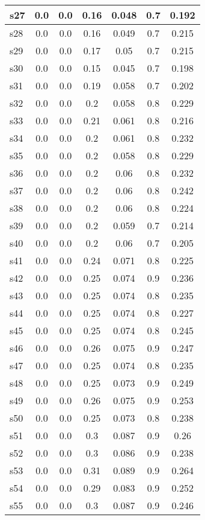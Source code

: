 \documentclass{article}
\begin{document}
\begin{tabular}{|l|c|c|c|c|c|c|}
\hline
s27 &0.0 & 0.0 & 0.16 & 0.048 & 0.7 & 0.192\\
\hline
s28 &0.0 & 0.0 & 0.16 & 0.049 & 0.7 & 0.215\\
\hline
s29 &0.0 & 0.0 & 0.17 & 0.05 & 0.7 & 0.215\\
\hline
s30 &0.0 & 0.0 & 0.15 & 0.045 & 0.7 & 0.198\\
\hline
s31 &0.0 & 0.0 & 0.19 & 0.058 & 0.7 & 0.202\\
\hline
s32 &0.0 & 0.0 & 0.2 & 0.058 & 0.8 & 0.229\\
\hline
s33 &0.0 & 0.0 & 0.21 & 0.061 & 0.8 & 0.216\\
\hline
s34 &0.0 & 0.0 & 0.2 & 0.061 & 0.8 & 0.232\\
\hline
s35 &0.0 & 0.0 & 0.2 & 0.058 & 0.8 & 0.229\\
\hline
s36 &0.0 & 0.0 & 0.2 & 0.06 & 0.8 & 0.232\\
\hline
s37 &0.0 & 0.0 & 0.2 & 0.06 & 0.8 & 0.242\\
\hline
s38 &0.0 & 0.0 & 0.2 & 0.06 & 0.8 & 0.224\\
\hline
s39 &0.0 & 0.0 & 0.2 & 0.059 & 0.7 & 0.214\\
\hline
s40 &0.0 & 0.0 & 0.2 & 0.06 & 0.7 & 0.205\\
\hline
s41 &0.0 & 0.0 & 0.24 & 0.071 & 0.8 & 0.225\\
\hline
s42 &0.0 & 0.0 & 0.25 & 0.074 & 0.9 & 0.236\\
\hline
s43 &0.0 & 0.0 & 0.25 & 0.074 & 0.8 & 0.235\\
\hline
s44 &0.0 & 0.0 & 0.25 & 0.074 & 0.8 & 0.227\\
\hline
s45 &0.0 & 0.0 & 0.25 & 0.074 & 0.8 & 0.245\\
\hline
s46 &0.0 & 0.0 & 0.26 & 0.075 & 0.9 & 0.247\\
\hline
s47 &0.0 & 0.0 & 0.25 & 0.074 & 0.8 & 0.235\\
\hline
s48 &0.0 & 0.0 & 0.25 & 0.073 & 0.9 & 0.249\\
\hline
s49 &0.0 & 0.0 & 0.26 & 0.075 & 0.9 & 0.253\\
\hline
s50 &0.0 & 0.0 & 0.25 & 0.073 & 0.8 & 0.238\\
\hline
s51 &0.0 & 0.0 & 0.3 & 0.087 & 0.9 & 0.26\\
\hline
s52 &0.0 & 0.0 & 0.3 & 0.086 & 0.9 & 0.238\\
\hline
s53 &0.0 & 0.0 & 0.31 & 0.089 & 0.9 & 0.264\\
\hline
s54 &0.0 & 0.0 & 0.29 & 0.083 & 0.9 & 0.252\\
\hline
s55 &0.0 & 0.0 & 0.3 & 0.087 & 0.9 & 0.246\\

\end{tabular}
\end{document}
